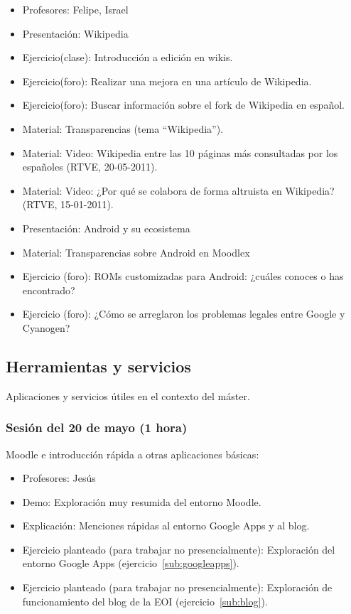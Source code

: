 \documentclass[a4paper,12pt]{article}
\begin{document}
\begin{itemize}
\item Profesores: Felipe, Israel
\item Presentación: Wikipedia
\item Ejercicio(clase): Introducción a edición en wikis.
\item Ejercicio(foro): Realizar una mejora en una artículo de Wikipedia.
\item Ejercicio(foro): Buscar información sobre el fork de Wikipedia en español.
\item Material: Transparencias (tema ``Wikipedia'').
\item Material: Video: Wikipedia entre las 10 páginas más consultadas por los 
españoles (RTVE, 20-05-2011).
\item Material: Video: ¿Por qué se colabora de forma altruista en Wikipedia? 
(RTVE, 15-01-2011).
\item Presentación: Android y su ecosistema
\item Material: Transparencias sobre Android en Moodlex
\item Ejercicio (foro): ROMs customizadas para Android: ¿cuáles
  conoces o has encontrado?
\item Ejercicio (foro): ¿Cómo se arreglaron los problemas legales
  entre Google y Cyanogen?
\end{itemize}

\subsection{Herramientas y servicios}

Aplicaciones y servicios útiles en el contexto del máster.

\subsubsection{Sesión del 20 de mayo (1 hora)}

Moodle e introducción rápida a otras aplicaciones básicas:

\begin{itemize}
\item Profesores: Jesús
\item Demo: Exploración muy resumida del entorno Moodle.
\item Explicación: Menciones rápidas al entorno Google Apps y al blog.
\item Ejercicio planteado (para trabajar no presencialmente): Exploración del entorno Google Apps (ejercicio~\ref{sub:googleapps}).
\item Ejercicio planteado (para trabajar no presencialmente): Exploración de funcionamiento del blog de la EOI (ejercicio~\ref{sub:blog}).
\end{itemize}
\end{document}
